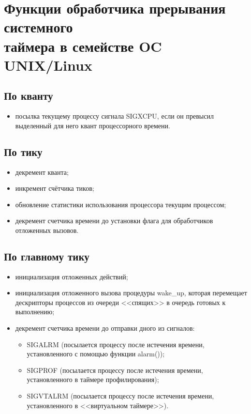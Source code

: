 \section{Функции обработчика прерывания системного \\ таймера в семействе OC UNIX/Linux}

\subsection*{По кванту}

\begin{itemize}[label*=--]
	\item посылка текущему процессу сигнала SIGXCPU, если он превысил выделенный для него квант процессорного времени.
\end{itemize}

\subsection*{По тику}

\begin{itemize}[label*=--]
	\item декремент кванта;
	\item инкремент счётчика тиков;
	\item обновление статистики использования процессора текущим процессом; %
	\item декремент счетчика времени до установки флага для обработчиков отложенных вызовов.
\end{itemize}

\subsection*{По главному тику}

\begin{itemize}[label*=--]
	\item инициализация отложенных действий;
	\item инициализация отложенного вызова процедуры wake\_up, которая перемещает дескрипторы процессов из очереди <<спящих>> в очередь готовых к выполнению;
	\item декремент счетчика времени до отправки дного из сигналов:
	\begin{itemize}[label=•]
		\item SIGALRM (посылается процессу после истечения времени, установленного с помощью функции alarm());
		\item SIGPROF (посылается процессу после истечения времени, установленного в таймере профилирования);
		\item SIGVTALRM (посылается процессу после истечения времени, установленного в  <<виртуальном таймере>>).
	\end{itemize}
\end{itemize}

